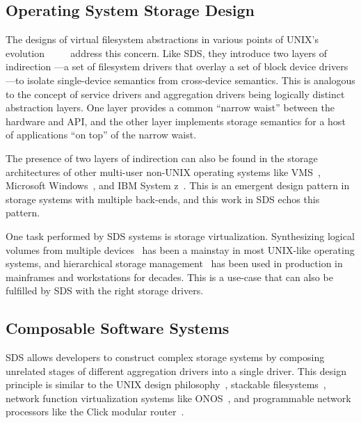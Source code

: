 \subsection{Operating System Storage Design}

The designs of virtual filesystem abstractions in various points of UNIX's evolution
~\cite{vnodes-sun-1986}~\cite{netbsd4.4-vfs-1995}~\cite{plan9-filesystem}~\cite{freebsd-design-book}
address this concern.  Like SDS, they introduce two layers of indirection
---a set of filesystem drivers that overlay a set of block device drivers---to
isolate single-device semantics from cross-device semantics.  This is analogous
to the concept of service drivers and aggregation drivers being logically
distinct abstraction layers.  One layer provides a common ``narrow waist''
between the hardware and API, and the other layer implements storage semantics
for a host of applications ``on top'' of the narrow waist.

The presence of two layers of indirection can also be found in the storage
architectures of other multi-user non-UNIX
operating systems like VMS~\cite{vms-driver-model}, Microsoft
Windows~\cite{ms-windows-driver-model}, and IBM System z~\cite{ibm-vsam}.
This is an emergent design pattern in storage systems with multiple
back-ends, and this work in SDS echos this pattern.

One task performed by SDS systems is storage virtualization.  Synthesizing
logical volumes from multiple devices~\cite{lvm} has been a mainstay in most UNIX-like
operating systems, and hierarchical storage management~\cite{hp-hsm} has been used
in production in mainframes and workstations for decades.  This is a use-case that can also be
fulfilled by SDS with the right storage drivers.

\subsection{Composable Software Systems}

SDS allows developers to construct complex storage systems by composing
unrelated stages of different aggregation drivers into a single driver.
This design principle is similar to the UNIX design philosophy~\cite{unix-design-philosophy},
stackable filesystems~\cite{stackable-filesystems}, network function virtualization systems
like ONOS~\cite{onos},
and programmable network processors like the Click modular router~\cite{click-modular-router}.

